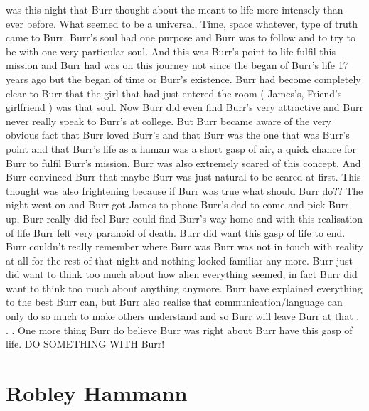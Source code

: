 \documentclass[12pt]{book}
\begin{document}
was this night that Burr thought about the meant to life more intensely than ever before. What seemed to be a universal, Time, space whatever, type of truth came to Burr. Burr's soul had one purpose and Burr was to follow and to try to be with one very particular soul. And this was Burr's point to life fulfil this mission and Burr had was on this journey not since the began of Burr's life 17 years ago but the began of time or Burr's existence. Burr had become completely clear to Burr that the girl that had just entered the room ( James's, Friend's girlfriend ) was that soul. Now Burr did even find Burr's very attractive and Burr never really speak to Burr's at college. But Burr became aware of the very obvious fact that Burr loved Burr's and that Burr was the one that was Burr's point and that Burr's life as a human was a short gasp of air, a quick chance for Burr to fulfil Burr's mission. Burr was also extremely scared of this concept. And Burr convinced Burr that maybe Burr was just natural to be scared at first. This thought was also frightening because if Burr was true what should Burr do?? The night went on and Burr got James to phone Burr's dad to come and pick Burr up, Burr really did feel Burr could find Burr's way home and with this realisation of life Burr felt very paranoid of death. Burr did want this gasp of life to end. Burr couldn't really remember where Burr was Burr was not in touch with reality at all for the rest of that night and nothing looked familiar any more. Burr just did want to think too much about how alien everything seemed, in fact Burr did want to think too much about anything anymore. Burr have explained everything to the best Burr can, but Burr also realise that communication/language can only do so much to make others understand and so Burr will leave Burr at that . . .  One more thing Burr do believe Burr was right about Burr have this gasp of life. DO SOMETHING WITH Burr!



\chapter{Robley Hammann}
\end{document}

